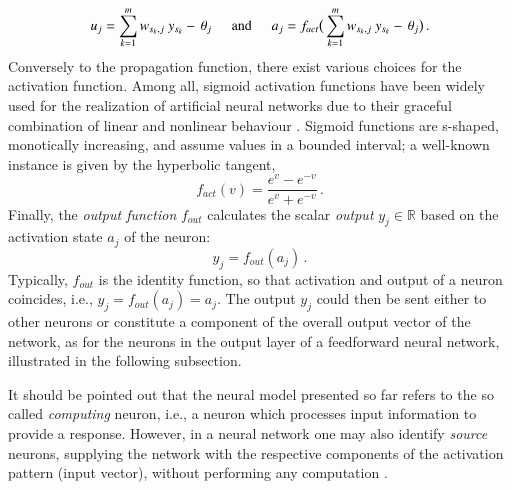 \documentclass{elsarticle}
\numberwithin{equation}{section}
\theoremstyle{theorem}
\theoremstyle{definition}
\theoremstyle{remark}
\theoremstyle{proposition}
\numberwithin{figure}{section}
\begin{document}
		\begin{equation*}
			u_j = \sum_{k = 1}^m w_{s_k,j} ~ y_{s_k} - \, \theta_j \hspace*{0.5cm} \text{and} \hspace*{0.5cm} a_j = f_{act} \big( \sum_{k = 1}^m w_{s_k,j} ~ y_{s_k} - \, \theta_j \big) \, .
		\end{equation*}		
		Conversely to the propagation function, there exist various choices for the activation function. Among all, sigmoid activation functions have been widely used for the realization of artificial neural networks due to their graceful combination of linear and nonlinear behaviour \cite{Hay05}. Sigmoid functions are s-shaped, monotically increasing, and assume values in a bounded interval; a well-known instance is given by the hyperbolic tangent,
		\begin{equation*}
			\label{eq:hyperbolic-tangent}
			f_{act}(v) = \dfrac{e^{v} - e^{-v}}{e^v + e^{-v}} \, .
		\end{equation*}
		Finally, the \emph{output function} $f_{out}$ calculates the scalar \emph{output} $y_j \in \mathbb{R}$ based on the activation state $a_j$ of the neuron:
		\begin{equation*}
			\label{eq:output-function}
			y_j = f_{out}(a_j) \, .
		\end{equation*} 
		Typically, $f_{out}$ is the identity function, so that activation and output of a neuron coincides, i.e., $y_j = f_{out}(a_j) = a_j$. %
		The output $y_j$ could then be sent either to other neurons or constitute a component of the overall output vector of the network, as for the neurons in the output layer of a feedforward neural network, illustrated in the following subsection.
		
		It should be pointed out that the neural model presented so far refers to the so called \emph{computing} neuron, i.e., a neuron which processes input information to provide a response. However, in a neural network one may also identify \emph{source} neurons, supplying the network with the respective components of the activation pattern (input vector), without performing any computation \cite{Hay05}.
		
		
\end{document}
